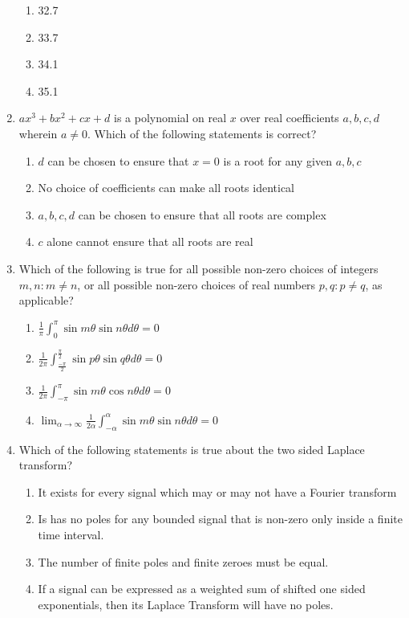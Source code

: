 \documentclass[journal]{IEEEtran}
\begin{document}
\begin{enumerate}
\begin{enumerate}
    \item 32.7
    \item 33.7
    \item 34.1
    \item 35.1
\end{enumerate}
\item $ax^{3}+bx^{2}+cx+d$ is a polynomial on real $x$ over real coefficients $a,b,c,d$ wherein $a\neq0$. Which of the following statements is correct?
\begin{enumerate}
    \item $d$ can be chosen to ensure that $x=0$ is a root for any given $a, b, c$
    \item No choice of coefficients can make all roots identical
    \item $a,b,c,d$ can be chosen to ensure that all roots are complex
    \item $c$ alone cannot ensure that all roots are real 
\end{enumerate}
\item Which of the following is true for all possible non-zero choices of integers $m,n:m\neq n$, or all possible non-zero choices of real numbers $p,q:p\neq q$, as applicable?
\begin{enumerate}
    \item $\frac{1}{\pi} \int_{0}^{\pi}\sin m\theta \sin n\theta d \theta =0$
    \item $\frac{1}{2\pi} \int_{\frac{-\pi}{2}}^{\frac{\pi}{2}}\sin p\theta \sin q\theta d \theta =0$
    \item $\frac{1}{2\pi} \int_{-\pi}^{\pi}\sin m\theta \cos n\theta d \theta =0$
    \item $ \lim_{\alpha \to \infty} \frac{1}{2\alpha} \int_{-\alpha}^{\alpha}\sin m\theta \sin n\theta d \theta =0$
\end{enumerate}
\item Which of the following statements is true about the two sided Laplace transform?
\begin{enumerate}
    \item It exists for every signal which may or may not have a Fourier transform
    \item Is has no poles for any bounded signal that is non-zero only inside a finite time interval.
    \item The number of finite poles and finite zeroes must be equal.
    \item If a signal can be expressed as a weighted sum of shifted one sided exponentials, then its Laplace Transform will have no poles.
\end{enumerate}
\end{enumerate}
\end{document}
